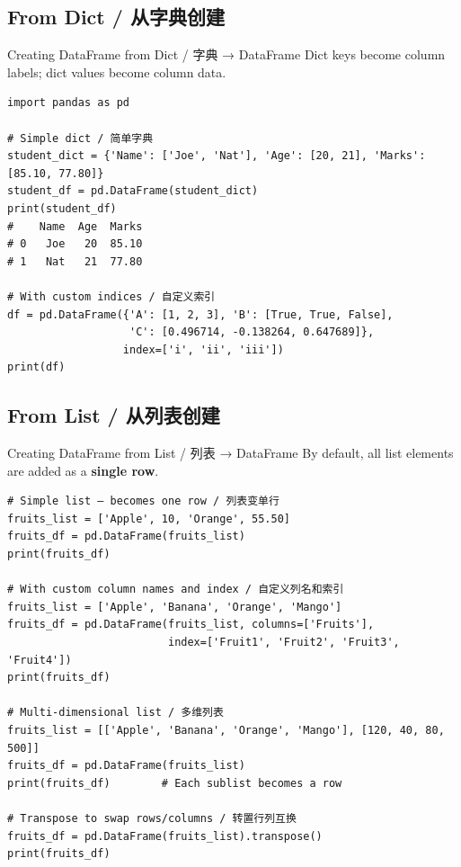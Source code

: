 \documentclass[11pt,a4paper]{report}
\begin{document}
\subsection{From Dict / 从字典创建}

\begin{examplebox}{Creating DataFrame from Dict / 字典 → DataFrame}
    Dict keys become column labels; dict values become column data.
\begin{lstlisting}
import pandas as pd

# Simple dict / 简单字典
student_dict = {'Name': ['Joe', 'Nat'], 'Age': [20, 21], 'Marks': [85.10, 77.80]}
student_df = pd.DataFrame(student_dict)
print(student_df)
#    Name  Age  Marks
# 0   Joe   20  85.10
# 1   Nat   21  77.80

# With custom indices / 自定义索引
df = pd.DataFrame({'A': [1, 2, 3], 'B': [True, True, False],
                   'C': [0.496714, -0.138264, 0.647689]},
                  index=['i', 'ii', 'iii'])
print(df)
\end{lstlisting}
\end{examplebox}

\subsection{From List / 从列表创建}

\begin{examplebox}{Creating DataFrame from List / 列表 → DataFrame}
    By default, all list elements are added as a \textbf{single row}.
\begin{lstlisting}
# Simple list — becomes one row / 列表变单行
fruits_list = ['Apple', 10, 'Orange', 55.50]
fruits_df = pd.DataFrame(fruits_list)
print(fruits_df)

# With custom column names and index / 自定义列名和索引
fruits_list = ['Apple', 'Banana', 'Orange', 'Mango']
fruits_df = pd.DataFrame(fruits_list, columns=['Fruits'],
                         index=['Fruit1', 'Fruit2', 'Fruit3', 'Fruit4'])
print(fruits_df)

# Multi-dimensional list / 多维列表
fruits_list = [['Apple', 'Banana', 'Orange', 'Mango'], [120, 40, 80, 500]]
fruits_df = pd.DataFrame(fruits_list)
print(fruits_df)        # Each sublist becomes a row

# Transpose to swap rows/columns / 转置行列互换
fruits_df = pd.DataFrame(fruits_list).transpose()
print(fruits_df)
\end{lstlisting}
\end{examplebox}
\end{document}
